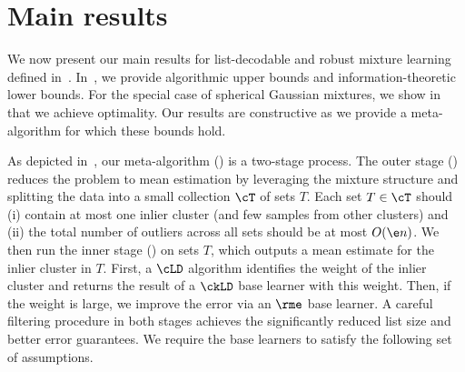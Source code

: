 \section{Main results}
\label{sec:main_results}

We now present our main results for list-decodable and robust mixture learning defined in~. %
In~, we provide algorithmic upper bounds and information-theoretic lower bounds. For the special case of spherical Gaussian mixtures, we show in~ that we achieve optimality. 
Our results are constructive as we provide a meta-algorithm for which these bounds hold. 

As depicted in~, our meta-algorithm () is a two-stage process. The outer stage () reduces the problem to mean estimation by leveraging the mixture structure and splitting the data into a small collection $\cT$ of sets $T$.
Each set $T \in \cT$ should (i) contain at most one inlier cluster (and few samples from other clusters) and (ii) the total number of outliers across all sets should be at most \(O(\e n)\).
We then run the inner stage () on sets \(T\), which outputs a mean estimate for the inlier cluster in $T$. First, a \(\cLD\) algorithm identifies the weight of the inlier cluster and returns the result of a \(\ckLD\) base learner with this weight. Then, if the weight is large, we improve the error via an \(\rme\) base learner. 
A careful filtering procedure in both stages achieves the significantly reduced list size and better error guarantees. 
We require the base learners to satisfy the following set of assumptions.

